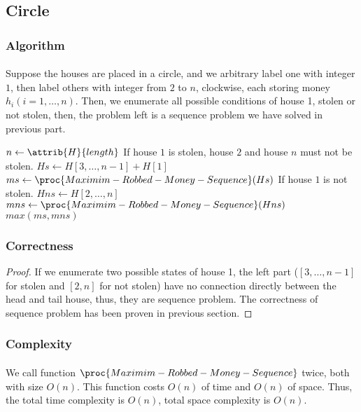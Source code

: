 \documentclass[]{article}
\begin{document}
        
        
        \subsection{Circle}
            \subsubsection{Algorithm}
                \paragraph{}Suppose the houses are placed in a circle, and we arbitrary label one with integer $1$, then label others with integer from $2$ to $n$, clockwise, each storing money $h_i(i = 1,\dots,n)$.  Then, we enumerate all possible conditions of house 1, stolen or not stolen, then, the problem left is a sequence problem we have solved in previous part.
                \begin{codebox}
\li $n \gets \attrib{H}{length}$
\zi \Comment If house $1$ is stolen, house $2$ and house $n$ must not be stolen.
\li $Hs \gets H[3,\dots,n-1] + H[1]$ 
\li $ms \gets \proc{Maximim-Robbed-Money-Sequence}(Hs)$
\zi \Comment If house $1$ is not stolen.
\li $Hns \gets H[2,\dots,n]$
\li $mns \gets \proc{Maximim-Robbed-Money-Sequence}(Hns)$
\li \Return $max(ms, mns)$
                \end{codebox}
            \subsubsection{Correctness}
            \begin{proof}
            If we enumerate two possible states of house 1, the left part ($[3,\dots,n-1]$ for stolen and $[2,n]$ for not stolen) have no connection directly between the head and tail house, thus, they are sequence problem. The correctness of sequence problem has been proven in previous section.
            \end{proof}
                
            \subsubsection{Complexity}
                \paragraph{} We call function $\proc{Maximim-Robbed-Money-Sequence}$ twice, both with size $O(n)$. This function costs $O(n)$ of time and $O(n)$ of space. Thus, the total time complexity is $O(n)$, total space complexity is $O(n)$.
        
\end{document}

